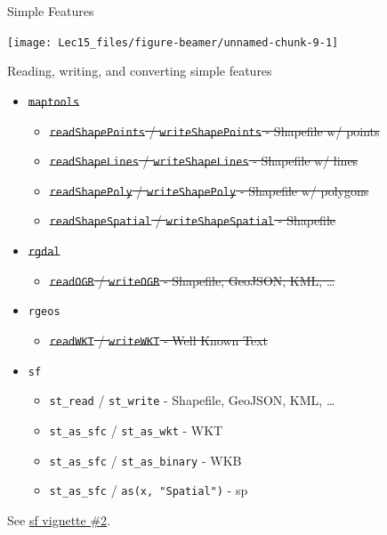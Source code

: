 \documentclass[11pt,ignorenonframetext,]{beamer}
\providecommand{\tightlist}{%
  \setlength{\itemsep}{0pt}\setlength{\parskip}{0pt}}
\begin{document}
\begin{frame}{Simple Features}
\protect\hypertarget{simple-features}{}

\begin{center}\texttt{[image: Lec15\_files/figure-beamer/unnamed-chunk-9-1]} \end{center}

\end{frame}

\begin{frame}[fragile,t]{Reading, writing, and converting simple
features}
\protect\hypertarget{reading-writing-and-converting-simple-features}{}

\begin{itemize}
\tightlist
\item
  \sout{\texttt{maptools}}

  \begin{itemize}
  \tightlist
  \item
    \sout{\texttt{readShapePoints} / \texttt{writeShapePoints} -
    Shapefile w/ points}
  \item
    \sout{\texttt{readShapeLines} / \texttt{writeShapeLines} - Shapefile
    w/ lines}
  \item
    \sout{\texttt{readShapePoly} / \texttt{writeShapePoly} - Shapefile
    w/ polygons}
  \item
    \sout{\texttt{readShapeSpatial} / \texttt{writeShapeSpatial} -
    Shapefile}
  \end{itemize}
\item
  \sout{\texttt{rgdal}}

  \begin{itemize}
  \tightlist
  \item
    \sout{\texttt{readOGR} / \texttt{writeOGR} - Shapefile, GeoJSON,
    KML, \ldots{}}
  \end{itemize}
\item
  \texttt{rgeos}

  \begin{itemize}
  \tightlist
  \item
    \sout{\texttt{readWKT} / \texttt{writeWKT} - Well Known Text}
  \end{itemize}
\item
  \texttt{sf}

  \begin{itemize}
  \tightlist
  \item
    \texttt{st\_read} / \texttt{st\_write} - Shapefile, GeoJSON, KML,
    \ldots{}
  \item
    \texttt{st\_as\_sfc} / \texttt{st\_as\_wkt} - WKT
  \item
    \texttt{st\_as\_sfc} / \texttt{st\_as\_binary} - WKB
  \item
    \texttt{st\_as\_sfc} / \texttt{as(x,\ "Spatial")} - sp
  \end{itemize}
\end{itemize}

See
\href{https://cran.r-project.org/web/packages/sf/vignettes/sf2.html}{sf
vignette \#2}.

\end{frame}
\end{document}
